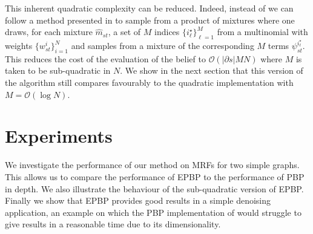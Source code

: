 This inherent quadratic complexity can be reduced. Indeed, instead of we can follow a method presented in \cite{briers05} to sample from a product of mixtures where one draws, for each mixture $\widehat m_{st}$, a set of $M$ indices $\{i^{\star}_{\ell}\}_{\ell=1}^{M}$ from a multinomial with weights $\{w^{i}_{st}\}_{i=1}^{N}$ and samples from a mixture of the corresponding $M$ terms $\psi^{i^{\star}_{\ell}}_{st}$. 
This reduces the cost of the evaluation of the belief to $\mathcal O(|\partial {s}|MN)$ where $M$ is taken to be sub-quadratic in $N$. 
We show in the next section that this version of the algorithm still compares favourably to the quadratic implementation with $M = \mathcal O(\log N)$. 




\section{Experiments}

We investigate the performance of our method on MRFs for two simple graphs. This allows us to compare the performance of EPBP to the performance of PBP in depth. We also illustrate the behaviour of the sub-quadratic version of EPBP. Finally we show that EPBP provides good results in a simple denoising application, an example on which the PBP implementation of \citet{ihler09} would struggle to give results in a reasonable time due to its dimensionality.

